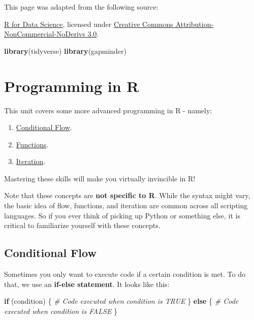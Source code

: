 \documentclass[]{book}
\newenvironment{Shaded}{\begin{snugshade}}{\end{snugshade}}
\newcommand{\KeywordTok}[1]{\textcolor[rgb]{0.13,0.29,0.53}{\textbf{#1}}}
\newcommand{\CommentTok}[1]{\textcolor[rgb]{0.56,0.35,0.01}{\textit{#1}}}
\newcommand{\ControlFlowTok}[1]{\textcolor[rgb]{0.13,0.29,0.53}{\textbf{#1}}}
\newcommand{\NormalTok}[1]{#1}
\providecommand{\tightlist}{%
  \setlength{\itemsep}{0pt}\setlength{\parskip}{0pt}}
\begin{document}
This page was adapted from the following source:

\href{https://r4ds.had.co.nz}{R for Data Science}, licensed under
\href{https://creativecommons.org/licenses/by-nc-nd/3.0/us/}{Creative
Commons Attribution-NonCommercial-NoDerivs 3.0}.

\begin{Shaded}
\begin{Highlighting}[]
\KeywordTok{library}\NormalTok{(tidyverse)}
\KeywordTok{library}\NormalTok{(gapminder)}
\end{Highlighting}
\end{Shaded}

\chapter{Programming in R}\label{programming-in-r}

This unit covers some more advanced programming in R - namely:

\begin{enumerate}
\def\labelenumi{\arabic{enumi}.}
\tightlist
\item
  \protect\hyperlink{conditional-flow}{Conditional Flow}.
\item
  \protect\hyperlink{functions-1}{Functions}.
\item
  \protect\hyperlink{iteration}{Iteration}.
\end{enumerate}

Mastering these skills will make you virtually invincible in R!

Note that these concepts are \textbf{not specific to R}. While the
syntax might vary, the basic idea of flow, functions, and iteration are
common across all scripting languages. So if you ever think of picking
up Python or something else, it is critical to familiarize yourself with
these concepts.

\hypertarget{conditional-flow}{\section{Conditional
Flow}\label{conditional-flow}}

Sometimes you only want to execute code if a certain condition is met.
To do that, we use an \textbf{if-else statement}. It looks like this:

\begin{Shaded}
\begin{Highlighting}[]
\ControlFlowTok{if}\NormalTok{ (condition) \{}
  \CommentTok{# Code executed when condition is TRUE}
\NormalTok{\} }\ControlFlowTok{else}\NormalTok{ \{}
  \CommentTok{# Code executed when condition is FALSE}
\NormalTok{\}}
\end{Highlighting}
\end{Shaded}
\end{document}
